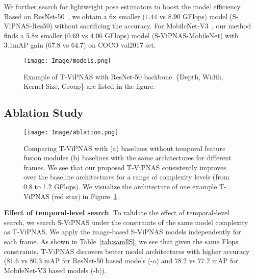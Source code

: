 \documentclass[final]{cvpr}
\begin{document}
We further search for lightweight pose estimators to boost the model efficiency. Based on ResNet-50~\cite{xiao2018simple}, we obtain a 6x smaller ($1.44$ vs $8.90$ GFlops) model (S-ViPNAS-Res50) without sacrificing the accuracy. For MobileNet-V3~\cite{howard2019searching}, our method finds a 5.8x smaller ($0.69$ vs $4.06$ GFlops) model (S-ViPNAS-MobileNet) with 3.1mAP gain ($67.8$ vs $64.7$) on COCO val2017 set.


\begin{figure*}[tb]
\begin{center}
	\texttt{[image: Image/models.png]}
	\caption{Example of T-ViPNAS with ResNet-50 backbone. \{Depth, Width, Kernel Size, Group\} are listed in the figure. 
	}
	\label{fig:network_architecture}
	\end{center}
	\vspace{-10pt}
\end{figure*}

\subsection{Ablation Study}

\begin{figure*}[tb]
	\centering
	\texttt{[image: Image/ablation.png]}
	\caption{Comparing T-ViPNAS with (a) baselines without temporal feature fusion modules (b) baselines with the same architectures for different frames. We see that our proposed T-ViPNAS consistently improves over the baseline architectures for a range of complexity levels (from 0.8 to 1.2 GFlops). We visualize the architecture of one example T-ViPNAS (red star) in Figure~\ref{fig:network_architecture}. }
	\label{fig:ablation}
\end{figure*}


\textbf{Effect of temporal-level search}. To validate the effect of temporal-level search, we search S-ViPNAS under the constraints of the same model complexity as T-ViPNAS. We apply the image-based S-ViPNAS models independently for each frame. As shown in Table~\ref{tab:samllS}, we see that given the same Flops constraints, T-ViPNAS discovers better model architectures with higher accuracy (81.6 vs 80.3 mAP for ResNet-50 based models (-a) and 78.2 vs 77.2 mAP for MobileNet-V3 based models (-b)).
\end{document}
